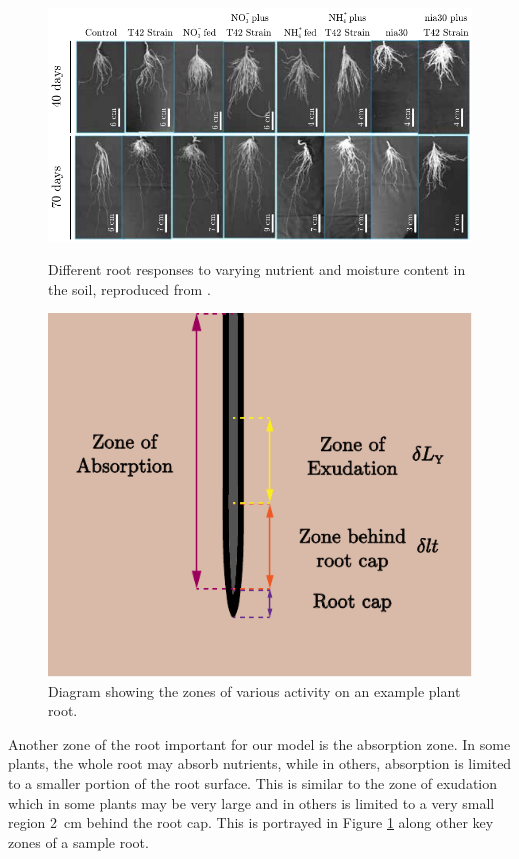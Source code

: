 \documentclass[11pt]{article}
\numberwithin{equation}{section}
\begin{document}
\begin{figure}
\centering
\begin{minipage}{.45\textwidth}
    \centering
    \includegraphics[width=\linewidth]{Figures/rootMorphology.pdf}
    \caption{ Different root responses to varying nutrient and moisture content in the soil, reproduced from \cite{PURNOBASUKI20182012}.}
    \label{fig:roots}
\end{minipage}%
\hfill
\begin{minipage}{.45\textwidth}
  \centering
    \includegraphics[width=.6\textwidth]{Figures/ZonesDiagram-plot.pdf}
    \caption{Diagram showing the zones of various activity on an example plant root.}
    \label{fig:zones}
\end{minipage}
\end{figure}

Another zone of the root important for our model is the absorption zone. In some plants, the whole root may absorb nutrients, while in others, absorption is limited to a smaller portion of the root surface. This is similar to the zone of exudation which in some plants may be very large and in others is limited to a very small region \SI{2}{cm} behind the root cap. This is portrayed in Figure \ref{fig:zones} along other key zones of a sample root.
\end{document}
